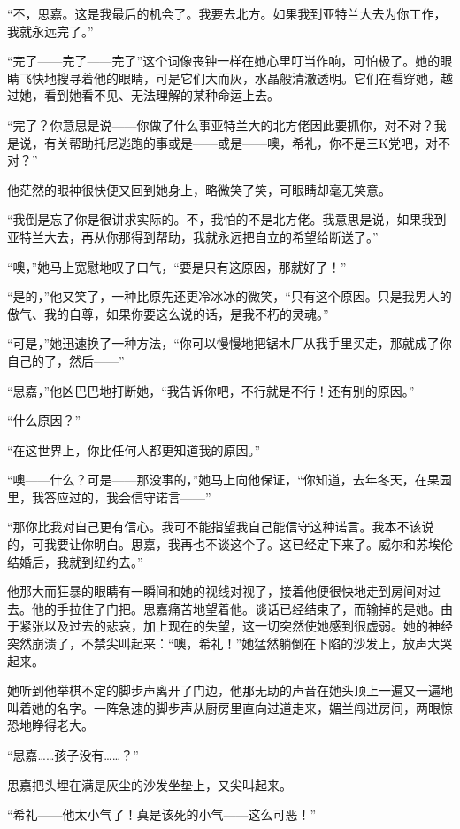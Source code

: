 \par “不，思嘉。这是我最后的机会了。我要去北方。如果我到亚特兰大去为你工作，我就永远完了。”
\par “完了——完了——完了”这个词像丧钟一样在她心里叮当作响，可怕极了。她的眼睛飞快地搜寻着他的眼睛，可是它们大而灰，水晶般清澈透明。它们在看穿她，越过她，看到她看不见、无法理解的某种命运上去。
\par “完了？你意思是说——你做了什么事亚特兰大的北方佬因此要抓你，对不对？我是说，有关帮助托尼逃跑的事或是——或是——噢，希礼，你不是三K党吧，对不对？”
\par 他茫然的眼神很快便又回到她身上，略微笑了笑，可眼睛却毫无笑意。
\par “我倒是忘了你是很讲求实际的。不，我怕的不是北方佬。我意思是说，如果我到亚特兰大去，再从你那得到帮助，我就永远把自立的希望给断送了。”
\par “噢，”她马上宽慰地叹了口气，“要是只有这原因，那就好了！”
\par “是的，”他又笑了，一种比原先还更冷冰冰的微笑，“只有这个原因。只是我男人的傲气、我的自尊，如果你要这么说的话，是我不朽的灵魂。”
\par “可是，”她迅速换了一种方法，“你可以慢慢地把锯木厂从我手里买走，那就成了你自己的了，然后——”
\par “思嘉，”他凶巴巴地打断她，“我告诉你吧，不行就是不行！还有别的原因。”
\par “什么原因？”
\par “在这世界上，你比任何人都更知道我的原因。”
\par “噢——什么？可是——那没事的，”她马上向他保证，“你知道，去年冬天，在果园里，我答应过的，我会信守诺言——”
\par “那你比我对自己更有信心。我可不能指望我自己能信守这种诺言。我本不该说的，可我要让你明白。思嘉，我再也不谈这个了。这已经定下来了。威尔和苏埃伦结婚后，我就到纽约去。”
\par 他那大而狂暴的眼睛有一瞬间和她的视线对视了，接着他便很快地走到房间对过去。他的手拉住了门把。思嘉痛苦地望着他。谈话已经结束了，而输掉的是她。由于紧张以及过去的悲哀，加上现在的失望，这一切突然使她感到很虚弱。她的神经突然崩溃了，不禁尖叫起来：“噢，希礼！”她猛然躺倒在下陷的沙发上，放声大哭起来。
\par 她听到他举棋不定的脚步声离开了门边，他那无助的声音在她头顶上一遍又一遍地叫着她的名字。一阵急速的脚步声从厨房里直向过道走来，媚兰闯进房间，两眼惊恐地睁得老大。
\par “思嘉……孩子没有……？”
\par 思嘉把头埋在满是灰尘的沙发坐垫上，又尖叫起来。
\par “希礼——他太小气了！真是该死的小气——这么可恶！”
